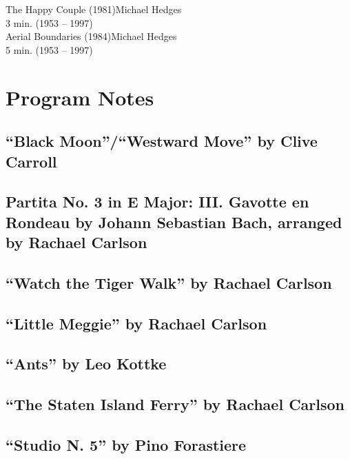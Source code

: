 \message{ !name(carlsonProgramNotes.tex)}\documentclass{article}
\begin{document}
\noindent The Happy Couple (1981)\dotfill Michael Hedges\\
3 min. \hfill (1953 -- 1997)\\

\noindent Aerial Boundaries (1984)\dotfill Michael Hedges\\
5 min. \hfill (1953 -- 1997)\\
\clearpage

\section*{Program Notes}
\label{sec:program-notes}

\subsection*{``Black Moon''/``Westward Move'' by Clive Carroll}
\label{sec:black-moonw-move}

\subsection*{Partita No. 3 in E Major: III. Gavotte en Rondeau by Johann Sebastian Bach, arranged by Rachael Carlson}
\label{sec:partita-no.-3}

\subsection*{``Watch the Tiger Walk'' by Rachael Carlson}
\label{sec:watch-tiger-walk}

\subsection*{``Little Meggie'' by Rachael Carlson}
\label{sec:little-megg-rach}

\subsection*{``Ants'' by Leo Kottke}
\label{sec:ants-leo-kottke}

\subsection*{``The Staten Island Ferry'' by Rachael Carlson}

\subsection*{``Studio N. 5'' by Pino Forastiere}
\end{document}
